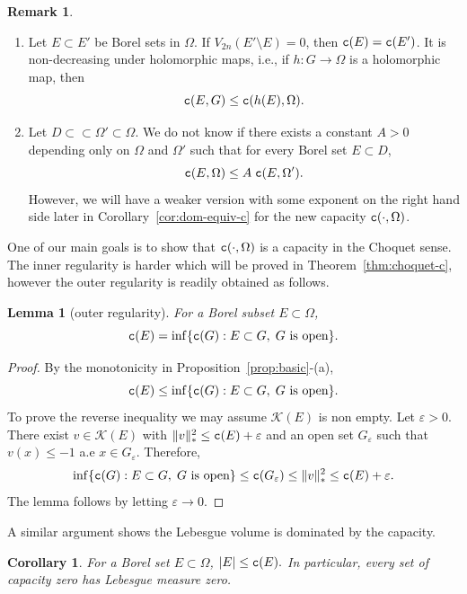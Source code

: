 \documentclass{amsart}
\newcommand{\veps}{\varepsilon}
\newcommand{\tc}{{\tt c}}
\newcommand{\Om}{\Omega}
\newcommand{\cali}[1]{\mathscr{#1}}
\newcommand{\Kc}{\cali{K}}
\newtheorem{lem}[thm]{Lemma}
\newtheorem{cor}[thm]{Corollary}
\theoremstyle{definition}
\newtheorem{remark}[thm]{Remark}
\numberwithin{thm}{section}
\numberwithin{equation}{section}
\renewcommand{\[}{\begin{equation}}
\renewcommand{\]}{\end{equation}}
\begin{document}
\begin{remark} \label{rmk:c-equiv} \mbox{}
\begin{enumerate}
\item[(a)] Let $E \subset E'$ be Borel sets in $\Om$. If $V_{2n}(E'\setminus E)=0$, then $\tc(E) = \tc(E')$. It is  non-decreasing under holomorphic maps, i.e., if  $h: G \to \Om$ is a holomorphic map, then
$$
	\tc (E,G) \leq \tc (h(E), \Om). 
$$
\item[(b)] Let $D\subset\subset \Om' \subset \Om$. 
We do not know if  there exists a constant $A>0$ depending only on $\Om$ and $\Om'$ such that  for every Borel set $ E\subset D$, 
\[\label{eq:c-comparablity}
	 \tc(E,\Om) \leq A\; \tc(E, \Om').
\]
However, we will have a weaker version with some exponent on the right hand side later 
in Corollary~\ref{cor:dom-equiv-c} for the new capacity $\tc (\cdot, \Om)$.
\end{enumerate}
\end{remark}


One of our main goals is to show that $\tc (\cdot, \Om)$ is a capacity in the Choquet sense. The inner regularity is harder which will be proved in Theorem~\ref{thm:choquet-c}, however the outer regularity is readily obtained as follows. 

\begin{lem}[outer regularity] \label{lem:outer-reg} For a Borel subset $E\subset \Om$,
\[\notag	\tc(E) = \inf\{ \tc(G) : E \subset G,\; G \text{ is open}\}.
\]
\end{lem}

\begin{proof} By the monotonicity in Proposition~\ref{prop:basic}-(a), 
$$
	\tc(E) \leq \inf\{ \tc(G) : E \subset G,\; G \text{ is open}\}.
$$
To prove the reverse inequality we may assume $\Kc(E)$ is non empty. Let $\veps>0$. There exist $v\in \Kc(E)$ with 
$
	\|v\|_*^2 \leq \tc(E) +\veps
$
and  an open set $G_\veps$ such that $v(x)\leq - 1$ a.e $x\in G_\veps$. Therefore, 
$$
	\inf\{ \tc(G) : E \subset G,\; G \text{ is open}\} \leq \tc(G_\veps) \leq \|v\|_*^2 \leq \tc(E) +\veps.
$$
The lemma follows by letting $\veps\to 0$.
\end{proof}

A similar argument shows the Lebesgue volume is dominated by the capacity.

\begin{cor}\label{cor:vol-c} For a Borel set $E\subset \Om$, 
$
	|E| \leq \tc(E).
$ In particular, every set of capacity zero has Lebesgue measure zero.
\end{cor}
\end{document}
